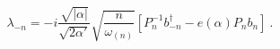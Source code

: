 \begin{equation}
\lambda_{-n}= - i \frac{\sqrt{|\alpha|}}{\sqrt{2 \alpha'}} 
\sqrt{\frac{n}{\omega_{(n)}}} 
\left[ P^{-1}_n b_{-n}^\dagger - e(\alpha) P_n b_{n} \right]~.
\label{Pla-nsv}
\end{equation}

